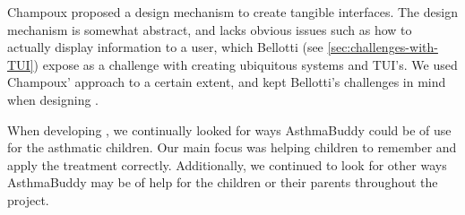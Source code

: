 Champoux proposed a design mechanism to create tangible interfaces. The design mechanism is somewhat abstract, and lacks obvious issues such as how to actually display information to a user, which Bellotti \etal{} (see \ref{sec:challenges-with-TUI}) expose as a challenge with creating ubiquitous systems and TUI's. We used Champoux' approach to a certain extent, and kept Bellotti's challenges in mind when designing \buddy{}.   

When developing \ab{}, we continually looked for ways AsthmaBuddy could be of use for the asthmatic children. Our main focus was helping children to remember and apply the treatment correctly. Additionally, we continued to look for other ways AsthmaBuddy may be of help for the children or their parents throughout the project.  

 